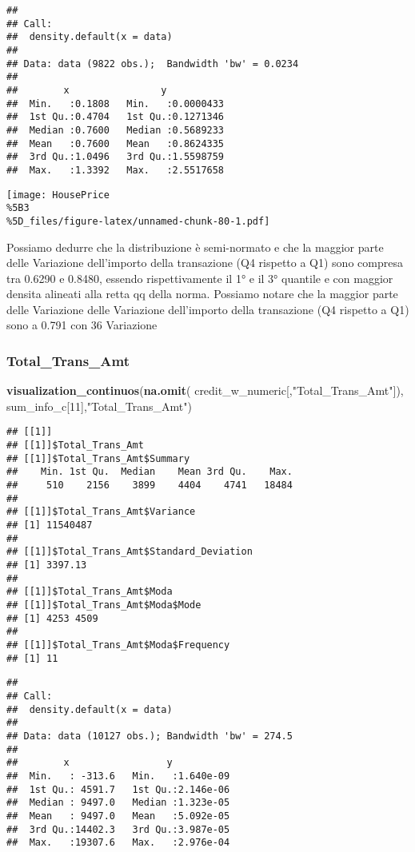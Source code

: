 \documentclass[
]{article}
\newenvironment{Shaded}{\begin{snugshade}}{\end{snugshade}}
\newcommand{\DecValTok}[1]{\textcolor[rgb]{0.00,0.00,0.81}{#1}}
\newcommand{\FunctionTok}[1]{\textcolor[rgb]{0.13,0.29,0.53}{\textbf{#1}}}
\newcommand{\NormalTok}[1]{#1}
\newcommand{\StringTok}[1]{\textcolor[rgb]{0.31,0.60,0.02}{#1}}
\begin{document}
\begin{verbatim}
## 
## Call:
##  density.default(x = data)
## 
## Data: data (9822 obs.);  Bandwidth 'bw' = 0.0234
## 
##        x                y            
##  Min.   :0.1808   Min.   :0.0000433  
##  1st Qu.:0.4704   1st Qu.:0.1271346  
##  Median :0.7600   Median :0.5689233  
##  Mean   :0.7600   Mean   :0.8624335  
##  3rd Qu.:1.0496   3rd Qu.:1.5598759  
##  Max.   :1.3392   Max.   :2.5517658
\end{verbatim}

\texttt{[image: HousePrice\\\%5B3\\\%5D\_files/figure-latex/unnamed-chunk-80-1.pdf]}

Possiamo dedurre che la distribuzione è semi-normato e che la maggior
parte delle Variazione dell'importo della transazione (Q4 rispetto a Q1)
sono compresa tra 0.6290 e 0.8480, essendo rispettivamente il 1° e il 3°
quantile e con maggior densita alineati alla retta qq della norma.
Possiamo notare che la maggior parte delle Variazione delle Variazione
dell'importo della transazione (Q4 rispetto a Q1) sono a 0.791 con 36
Variazione

\subsubsection{Total\_Trans\_Amt}\label{total_trans_amt}

\begin{Shaded}
\begin{Highlighting}[]
\FunctionTok{visualization\_continuos}\NormalTok{(}\FunctionTok{na.omit}\NormalTok{(}
\NormalTok{  credit\_w\_numeric[,}\StringTok{"Total\_Trans\_Amt"}\NormalTok{]), sum\_info\_c[}\DecValTok{11}\NormalTok{],}\StringTok{"Total\_Trans\_Amt"}\NormalTok{)}
\end{Highlighting}
\end{Shaded}

\begin{verbatim}
## [[1]]
## [[1]]$Total_Trans_Amt
## [[1]]$Total_Trans_Amt$Summary
##    Min. 1st Qu.  Median    Mean 3rd Qu.    Max. 
##     510    2156    3899    4404    4741   18484 
## 
## [[1]]$Total_Trans_Amt$Variance
## [1] 11540487
## 
## [[1]]$Total_Trans_Amt$Standard_Deviation
## [1] 3397.13
## 
## [[1]]$Total_Trans_Amt$Moda
## [[1]]$Total_Trans_Amt$Moda$Mode
## [1] 4253 4509
## 
## [[1]]$Total_Trans_Amt$Moda$Frequency
## [1] 11
\end{verbatim}

\begin{verbatim}
## 
## Call:
##  density.default(x = data)
## 
## Data: data (10127 obs.); Bandwidth 'bw' = 274.5
## 
##        x                 y            
##  Min.   : -313.6   Min.   :1.640e-09  
##  1st Qu.: 4591.7   1st Qu.:2.146e-06  
##  Median : 9497.0   Median :1.323e-05  
##  Mean   : 9497.0   Mean   :5.092e-05  
##  3rd Qu.:14402.3   3rd Qu.:3.987e-05  
##  Max.   :19307.6   Max.   :2.976e-04
\end{verbatim}
\end{document}
